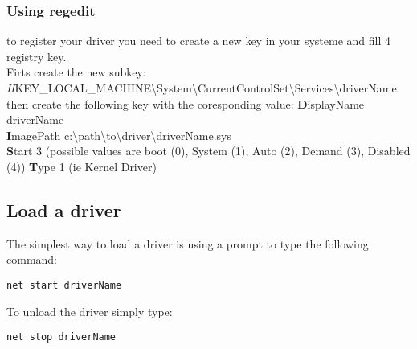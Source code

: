 \documentclass[a4paper,10pt]{article}
\begin{document}
\subsubsection{Using regedit}
to register your driver you need to create a new key in your systeme and fill
4 registry key.\\
Firts create the new subkey: {\textit
HKEY\_LOCAL\_MACHINE\textbackslash System\textbackslash CurrentControlSet\textbackslash Services\textbackslash driverName}
then create the following key with the coresponding value:
{\textbf DisplayName} driverName\\
{\textbf ImagePath} c:\textbackslash path\textbackslash to\textbackslash driver\textbackslash driverName.sys\\
{\textbf Start} 3 (possible values are boot (0),  System (1), Auto (2), Demand
(3), Disabled (4))
{\textbf Type} 1 (ie Kernel Driver)
\subsection{Load a driver}
The simplest way to load a driver is using a prompt to type the following
command:
\begin{lstlisting}
net start driverName
\end{lstlisting}
To unload the driver simply type:
\begin{lstlisting}
net stop driverName
\end{lstlisting}
\end{document}
